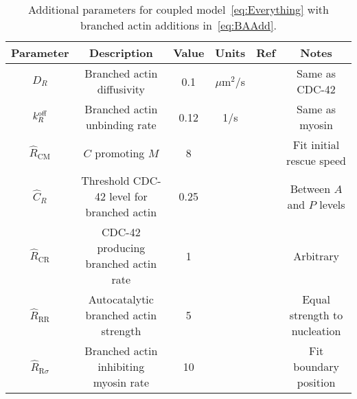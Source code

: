 \documentclass[11pt]{article}
\newcommand{\6}[1]{#1_{\text{6}}}
\newcommand{\3}[1]{#1_{\text{3}}}
\begin{document}
\begin{table}
\begin{small}
\centering
\begin{tabular}{|c|c|c|c|c|c|}\hline
Parameter & Description & Value & Units & Ref & Notes \\ \hline
$D_R$ & Branched actin diffusivity & 0.1 & $\mu$m$^2$/s & & Same as CDC-42 \\
$k^\text{off}_R$ & Branched actin unbinding rate & 0.12 & 1/s & & Same as myosin \\ \hline
$\hat R_\text{CM}$ & $C$ promoting $M$ & 8 & &  & Fit initial rescue speed\\ 
$\hat C_R$ & Threshold CDC-42 level for branched actin & 0.25 & & & Between $A$ and $P$ levels\\
$\hat R_\text{CR}$ & CDC-42 producing branched actin rate  & 1 & & & Arbitrary\\ 
$\hat R_\text{RR}$ & Autocatalytic branched actin strength  & 5 & & & Equal strength to nucleation\\ 
$\hat R_\text{R$\sigma$}$ & Branched actin inhibiting myosin rate & 10 & & & Fit boundary position\\  \hline
\end{tabular}
\caption{\label{tab:paramsBR} Additional parameters for coupled model\ \eqref{eq:Everything} with branched actin additions in\ \eqref{eq:BAAdd}.}
\end{small}
\end{table}




\end{document}
